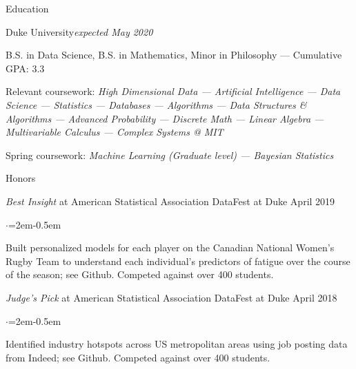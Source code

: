 \documentclass{resume} %
\begin{document}

\begin{rSection}{Education}

\begin{rSubsection}{Duke University}{\em expected May 2020}{}
\item  B.S. in Data Science, B.S. in Mathematics, Minor in Philosophy --- Cumulative GPA: 3.3
\item  Relevant coursework: {\em High Dimensional Data --- Artificial Intelligence --- Data Science --- Statistics --- Databases --- Algorithms --- Data Structures \& Algorithms --- Advanced Probability ---  Discrete Math  --- Linear Algebra --- Multivariable Calculus --- Complex Systems @ MIT}
\item Spring coursework: {\em Machine Learning (Graduate level) --- Bayesian Statistics}

\end{rSubsection}

\begin{rSubsection}{Honors}{}{}{}
	\item \textit{Best Insight} at American Statistical Association DataFest at Duke \hfill {April 2019}
		\begin{list}{$\cdot$}{\leftmargin=2em}\itemsep -0.5em \vspace{-0.5em}
			\item Built personalized models for each player on the Canadian National Women's Rugby Team to understand each individual's predictors of fatigue over the course of the season; see Github. Competed against over 400 students.
		\end{list}
	\item \textit{Judge's Pick} at American Statistical Association DataFest at Duke \hfill {April 2018}
	\begin{list}{$\cdot$}{\leftmargin=2em}\itemsep -0.5em \vspace{-0.5em}
			\item Identified industry hotspots across US metropolitan areas using job posting data from Indeed; see Github. Competed against over 400 students.
		\end{list}

\end{rSubsection}

\end{rSection}
\end{document}
